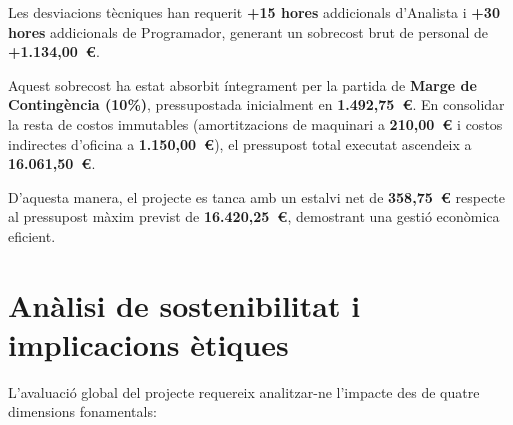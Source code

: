 Les desviacions tècniques han requerit \textbf{+15 hores} addicionals d'Analista i \textbf{+30 hores} addicionals de Programador, generant un sobrecost brut de personal de \textbf{+1.134,00~\euro{}}.

Aquest sobrecost ha estat absorbit íntegrament per la partida de \textbf{Marge de Contingència (10\%)}, pressupostada inicialment en \textbf{1.492,75~\euro{}}. En consolidar la resta de costos immutables (amortitzacions de maquinari a \textbf{210,00~\euro{}} i costos indirectes d'oficina a \textbf{1.150,00~\euro{}}), el pressupost total executat ascendeix a \textbf{16.061,50~\euro{}}.

D'aquesta manera, el projecte es tanca amb un estalvi net de \textbf{358,75~\euro{}} respecte al pressupost màxim previst de \textbf{16.420,25~\euro{}}, demostrant una gestió econòmica eficient.

\section{Anàlisi de sostenibilitat i implicacions ètiques}
L'avaluació global del projecte requereix analitzar-ne l'impacte des de quatre dimensions fonamentals:

